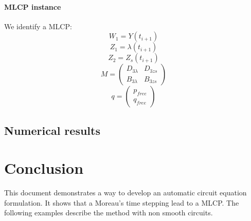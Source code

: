 \paragraph{MLCP instance}
We identify a MLCP:\\
\[W_{1} = Y(t_{i+1})\]
\[Z_{1} = \lambda(t_{i+1})\]
\[Z_{2} = Z_{s}(t_{i+1})\]
\[M = \left(\begin{array}{cc}
  D_{3\lambda}&D_{3zs}\\
B_{3\lambda}&B_{3zs}
\end{array}\right)\]
\[q=\left(\begin{array}{c}
p_{free}\\
q_{free}\end{array}\right)\]

\subsection{Numerical results}

\section{Conclusion}
This document demonstrates a way to develop an automatic circuit equation formulation. It shows that a Moreau's time
stepping lead to a MLCP. The following examples describe the method with non smooth circuits.


